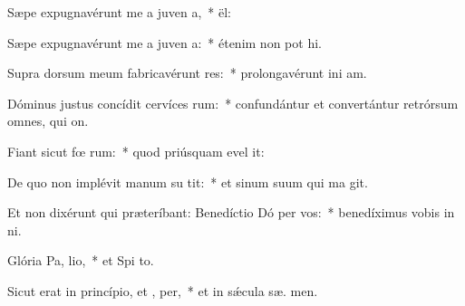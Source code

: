 \item Sæpe expugnavérunt me a juven a,~*   ël:
\item Sæpe expugnavérunt me a juven a:~* étenim non pot hi.
\item Supra dorsum meum fabricavérunt res:~* prolongavérunt ini am.
\item Dóminus justus concídit cervíces rum:~* confundántur et convertántur retrórsum omnes, qui  on.
\item Fiant sicut fœ rum:~* quod priúsquam evel it:
\item De quo non implévit manum su  tit:~* et sinum suum qui ma git.
\item Et non dixérunt qui præteríbant: Benedíctio Dó per vos:~* benedíximus vobis in  ni.
\item Glória Pa,  lio,~* et Spi to.
\item Sicut erat in princípio, et ,  per,~* et in sǽcula sæ. men.

